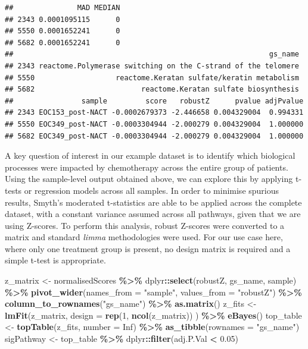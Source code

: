\documentclass[9pt,a4paper,]{extarticle}
\newenvironment{Shaded}{\begin{snugshade}}{\end{snugshade}}
\newcommand{\AttributeTok}[1]{\textcolor[rgb]{0.13,0.29,0.53}{#1}}
\newcommand{\ConstantTok}[1]{\textcolor[rgb]{0.56,0.35,0.01}{#1}}
\newcommand{\DecValTok}[1]{\textcolor[rgb]{0.00,0.00,0.81}{#1}}
\newcommand{\FloatTok}[1]{\textcolor[rgb]{0.00,0.00,0.81}{#1}}
\newcommand{\FunctionTok}[1]{\textcolor[rgb]{0.13,0.29,0.53}{\textbf{#1}}}
\newcommand{\NormalTok}[1]{#1}
\newcommand{\OtherTok}[1]{\textcolor[rgb]{0.56,0.35,0.01}{#1}}
\newcommand{\SpecialCharTok}[1]{\textcolor[rgb]{0.81,0.36,0.00}{\textbf{#1}}}
\newcommand{\StringTok}[1]{\textcolor[rgb]{0.31,0.60,0.02}{#1}}
\begin{document}
\begin{verbatim}
##               MAD MEDIAN
## 2343 0.0001095115      0
## 5550 0.0001652241      0
## 5682 0.0001652241      0
##                                                            gs_name
## 2343 reactome.Polymerase switching on the C-strand of the telomere
## 5550                   reactome.Keratan sulfate/keratin metabolism
## 5682                         reactome.Keratan sulfate biosynthesis
##                sample         score   robustZ      pvalue adjPvalue
## 2343 EOC153_post-NACT -0.0002679373 -2.446658 0.004329004  0.994331
## 5550 EOC349_post-NACT -0.0003304944 -2.000279 0.004329004  1.000000
## 5682 EOC349_post-NACT -0.0003304944 -2.000279 0.004329004  1.000000
\end{verbatim}

A key question of interest in our example dataset is to identify which biological processes were impacted by chemotherapy across the entire group of patients.
Using the sample-level output obtained above, we can explore this by applying t-tests or regression models across all samples.
In order to minimise spurious results, Smyth's moderated t-statistics\citep{Smyth_2004} are able to be applied across the complete dataset, with a constant variance assumed across all pathways, given that we are using Z-scores.
To perform this analysis, robust Z-scores were converted to a matrix and standard \emph{limma} methodologies were used.
For our use case here, where only one treatment group is present, no design matrix is required and a simple t-test is appropriate.

\begin{Shaded}
\begin{Highlighting}[]
\NormalTok{z\_matrix }\OtherTok{\textless{}{-}}\NormalTok{ normalisedScores }\SpecialCharTok{\%\textgreater{}\%}
\NormalTok{    dplyr}\SpecialCharTok{::}\FunctionTok{select}\NormalTok{(robustZ, gs\_name, sample) }\SpecialCharTok{\%\textgreater{}\%}
    \FunctionTok{pivot\_wider}\NormalTok{(}\AttributeTok{names\_from =} \StringTok{"sample"}\NormalTok{, }\AttributeTok{values\_from =} \StringTok{"robustZ"}\NormalTok{) }\SpecialCharTok{\%\textgreater{}\%}
    \FunctionTok{column\_to\_rownames}\NormalTok{(}\StringTok{"gs\_name"}\NormalTok{) }\SpecialCharTok{\%\textgreater{}\%}
    \FunctionTok{as.matrix}\NormalTok{()}
\NormalTok{z\_fits }\OtherTok{\textless{}{-}} \FunctionTok{lmFit}\NormalTok{(z\_matrix, }\AttributeTok{design =} \FunctionTok{rep}\NormalTok{(}\DecValTok{1}\NormalTok{, }\FunctionTok{ncol}\NormalTok{(z\_matrix))}
\NormalTok{                ) }\SpecialCharTok{\%\textgreater{}\%} 
  \FunctionTok{eBayes}\NormalTok{()}
\NormalTok{top\_table }\OtherTok{\textless{}{-}} \FunctionTok{topTable}\NormalTok{(z\_fits, }\AttributeTok{number =} \ConstantTok{Inf}\NormalTok{) }\SpecialCharTok{\%\textgreater{}\%}
  \FunctionTok{as\_tibble}\NormalTok{(}\AttributeTok{rownames =} \StringTok{"gs\_name"}\NormalTok{)}
\NormalTok{sigPathway }\OtherTok{\textless{}{-}}\NormalTok{ top\_table }\SpecialCharTok{\%\textgreater{}\%}
\NormalTok{    dplyr}\SpecialCharTok{::}\FunctionTok{filter}\NormalTok{(adj.P.Val }\SpecialCharTok{\textless{}} \FloatTok{0.05}\NormalTok{)}
\end{Highlighting}
\end{Shaded}
\end{document}
